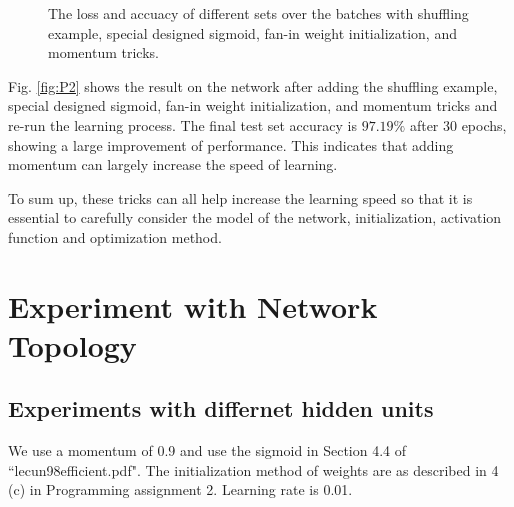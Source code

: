 \documentclass{article} %
\begin{document}
\begin{figure} [!htbp]
	
	\caption{The loss and accuacy of different sets over the batches with shuffling example, special designed sigmoid, fan-in weight initialization, and momentum tricks. }  
	\label{fig:P5}
\end{figure}

Fig. \ref{fig:P2} shows the result on the network after adding the shuffling example, special designed sigmoid, fan-in weight initialization, and momentum tricks and re-run the learning process. The final test set accuracy is $97.19\%$ after 30 epochs, showing a large improvement of performance. This indicates that adding momentum can largely increase the speed of learning.

To sum up, these tricks can all help increase the learning speed so that it is essential to carefully consider the model of the network, initialization, activation function and optimization method.

\section{Experiment with Network Topology}

\subsection{Experiments with differnet hidden units}
We use a momentum of 0.9 and use the sigmoid in Section 4.4 of ``lecun98efficient.pdf". The initialization method of weights are as described in 4 (c) in Programming assignment 2. Learning rate is 0.01.
\end{document}
